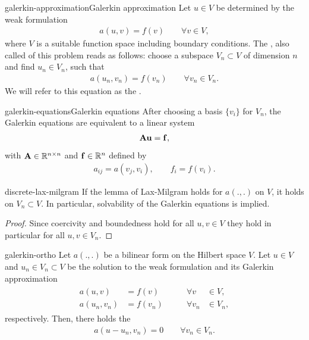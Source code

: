 \begin{Definition*}{galerkin-approximation}{Galerkin approximation}
  Let $u\in V$ be determined by the weak formulation
  \begin{gather*}
    a(u,v) = f(v) \qquad\forall v\in V,
  \end{gather*}
  where $V$ is a suitable function space including boundary
  conditions. The , also called
   of this problem reads as follows:
  choose a subspace $V_n\subset V$ of dimension $n$ and find
  $u_n\in V_n$, such that
  \begin{gather*}
    a(u_n,v_n) = f(v_n) \qquad\forall v_n\in V_n.
  \end{gather*}
  We will refer to this equation as the .
\end{Definition*}

\begin{Corollary*}{galerkin-equations}{Galerkin equations}
  After choosing a basis $\{v_i\}$ for $V_n$, the Galerkin equations are
  equivalent to a linear system
  \begin{gather}
    \mathbf A \mathbf u = \mathbf f,
  \end{gather}
  with $\mathbf A\in\mathbb R^{n\times n}$ and $\mathbf f\in \mathbb R^n$ defined by
  \begin{gather}
    a_{ij} = a(v_j, v_i), \qquad f_i = f(v_i).
  \end{gather}
\end{Corollary*}

\begin{Lemma}{discrete-lax-milgram}
  If the lemma of Lax-Milgram holds for $a(.,.)$ on $V$, it holds on
  $V_n\subset V$. In particular, solvability of the Galerkin equations
  is implied.
\end{Lemma}

\begin{proof}
  Since coercivity and boundedness hold for all $u,v\in V$ they hold
  in particular for all $u,v\in V_n$.
\end{proof}

\begin{Lemma}{galerkin-ortho}
  Let $a(.,.)$ be a bilinear form on the Hilbert
  space $V$.
  Let $u \in V$ and $u_n\in V_n \subset V$ be the solution to the
  weak formulation and its Galerkin approximation
  \begin{gather*}
    \begin{aligned}
      a(u,v) &= f(v) & \qquad\forall v&\in V,\\
      a(u_n,v_n) &= f(v_n) & \qquad\forall v_n&\in V_n,
    \end{aligned}
  \end{gather*}
  respectively. Then, there holds the 
  \begin{align}
    \label{eq:galerkin-ortho}
    a(u-u_n,v_n) = 0 \qquad \forall v_n\in V_n.
  \end{align}
\end{Lemma}


